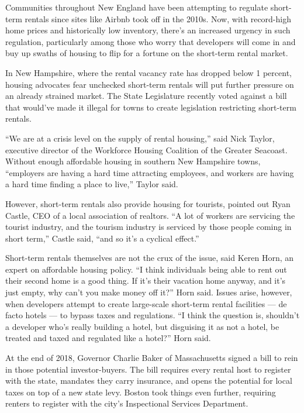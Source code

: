 Communities throughout New England have been attempting to regulate short-term rentals since sites like Airbnb took off in the 2010s. Now, with record-high home prices and historically low inventory, there's an increased urgency in such regulation, particularly among those who worry that developers will come in and buy up swaths of housing to flip for a fortune on the short-term rental market.

In New Hampshire, where the rental vacancy rate has dropped below 1 percent, housing advocates fear unchecked short-term rentals will put further pressure on an already strained market. The State Legislature recently voted against a bill that would've made it illegal for towns to create legislation restricting short-term rentals.

``We are at a crisis level on the supply of rental housing,'' said Nick Taylor, executive director of the Workforce Housing Coalition of the Greater Seacoast. Without enough affordable housing in southern New Hampshire towns, ``employers are having a hard time attracting employees, and workers are having a hard time finding a place to live,'' Taylor said.

However, short-term rentals also provide housing for tourists, pointed out Ryan Castle, CEO of a local association of realtors. ``A lot of workers are servicing the tourist industry, and the tourism industry is serviced by those people coming in short term,'' Castle said, ``and so it's a cyclical effect.''

Short-term rentals themselves are not the crux of the issue, said Keren Horn, an expert on affordable housing policy. ``I think individuals being able to rent out their second home is a good thing. If it's their vacation home anyway, and it's just empty, why can't you make money off it?'' Horn said. Issues arise, however, when developers attempt to create large-scale short-term rental facilities — de facto hotels — to bypass taxes and regulations. ``I think the question is, shouldn't a developer who's really building a hotel, but disguising it as not a hotel, be treated and taxed and regulated like a hotel?'' Horn said.

At the end of 2018, Governor Charlie Baker of Massachusetts signed a bill to rein in those potential investor-buyers. The bill requires every rental host to register with the state, mandates they carry insurance, and opens the potential for local taxes on top of a new state levy. Boston took things even further, requiring renters to register with the city's Inspectional Services Department.

